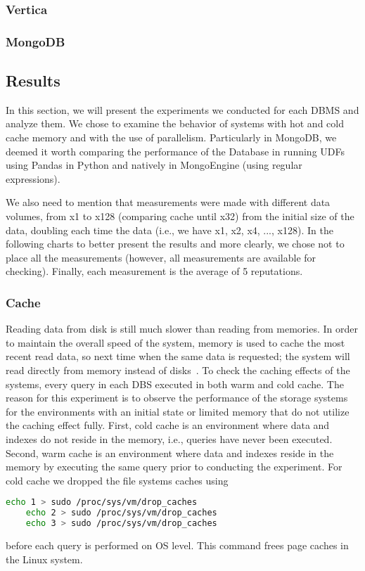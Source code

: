 \subsubsection{Vertica}
\subsubsection{MongoDB}


\subsection{Results}

In this section, we will present the experiments we conducted for each DBMS and analyze them. 
We chose to examine the behavior of systems with hot and cold cache memory and with the use of parallelism. 
Particularly in MongoDB, we deemed it worth comparing the performance of the Database in running UDFs using 
Pandas in Python and natively in MongoEngine (using regular expressions).

We also need to mention that measurements were made with different data volumes, 
from x1 to x128 (comparing cache until x32) from the initial size of the data, doubling each time the data (i.e., we have x1, x2, x4, ..., x128). 
In the following charts to better present the results and more clearly, we chose not to place all the measurements 
(however, all measurements are available for checking). Finally, each measurement is the average of 5 reputations.

\subsubsection{Cache}
Reading data from disk is still much slower than reading from memories. In
order to maintain the overall speed of the system, memory is used to cache the most
recent read data, so next time when the same data is requested; the system will read
directly from memory instead of disks~\cite{Smit82}. 
To check the caching effects of the systems, every query in each DBS executed in both warm and cold cache. 
The reason for this experiment is to observe the performance of the storage systems for the environments 
with an initial state or limited memory that do not utilize the caching effect fully. 
First, cold cache is an environment where data and indexes do not reside in the memory, i.e., queries have
never been executed. 
Second, warm cache is an environment where data and indexes
reside in the memory by executing the same query prior to conducting the experiment. 
For cold cache we dropped the file systems caches using
\begin{lstlisting}[language=bash]
	echo 1 > sudo /proc/sys/vm/drop_caches
	echo 2 > sudo /proc/sys/vm/drop_caches
	echo 3 > sudo /proc/sys/vm/drop_caches
\end{lstlisting} 
before each query is performed on OS level. 
This command frees page caches in the Linux system. 

